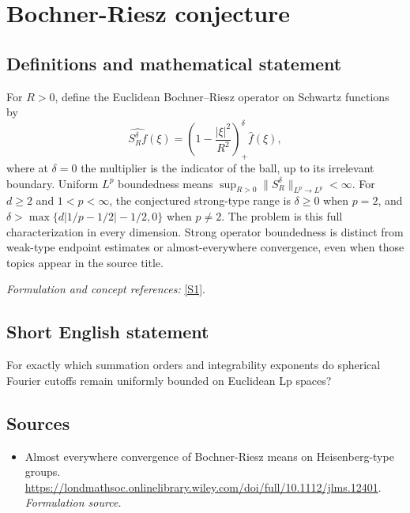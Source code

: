 \documentclass[11pt]{article}
\begin{document}
\section*{\texorpdfstring{Bochner-Riesz conjecture}{Bochner-Riesz conjecture}}\label{30006774}
\subsection{Definitions and mathematical statement}
For $R>0$, define the Euclidean Bochner--Riesz operator on Schwartz functions by
\[
 \widehat{S_R^\delta f}(\xi)=\left(1-\frac{|\xi|^2}{R^2}\right)_+^\delta\widehat f(\xi),
\]
where at $\delta=0$ the multiplier is the indicator of the ball, up to its irrelevant boundary. Uniform $L^p$ boundedness means
$\sup_{R>0}\|S_R^\delta\|_{L^p\to L^p}<\infty$.
For $d\ge2$ and $1<p<\infty$, the conjectured strong-type range is $\delta\ge0$ when $p=2$, and
$\delta>\max\{d|1/p-1/2|-1/2,0\}$ when $p\ne2$.
The problem is this full characterization in every dimension. Strong operator boundedness is distinct from weak-type endpoint estimates or almost-everywhere convergence, even when those topics appear in the source title.
\par\smallskip\textit{Formulation and concept references:} \href{https://londmathsoc.onlinelibrary.wiley.com/doi/full/10.1112/jlms.12401}{[S1]}.

\subsection{Short English statement}
For exactly which summation orders and integrability exponents do spherical Fourier cutoffs remain uniformly bounded on Euclidean Lp spaces?
\subsection{Sources}
\begin{itemize}
\item[S1]Almost everywhere convergence of Bochner-Riesz means on Heisenberg-type groups.
\url{https://londmathsoc.onlinelibrary.wiley.com/doi/full/10.1112/jlms.12401}.
\textit{Formulation source.}
\end{itemize}
\end{document}
